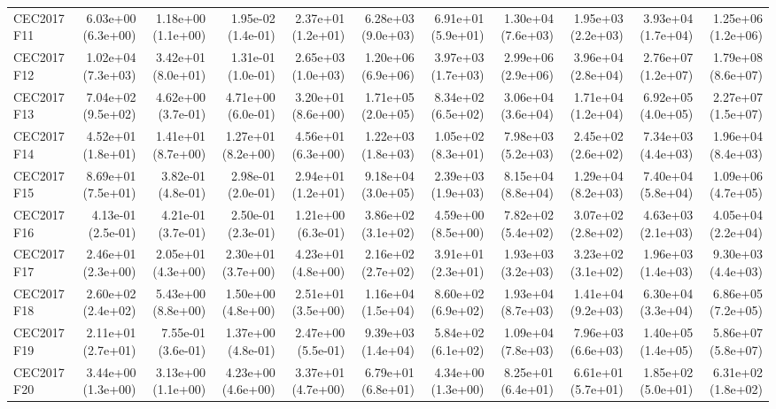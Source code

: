 \begin{longtable}{lrrrrrrrrrr}
CEC2017 F11 & 6.03e+00 (6.3e+00) & 1.18e+00 (1.1e+00) & 1.95e-02 (1.4e-01) & 2.37e+01 (1.2e+01) & 6.28e+03 (9.0e+03) & 6.91e+01 (5.9e+01) & 1.30e+04 (7.6e+03) & 1.95e+03 (2.2e+03) & 3.93e+04 (1.7e+04) & 1.25e+06 (1.2e+06) \\
CEC2017 F12 & 1.02e+04 (7.3e+03) & 3.42e+01 (8.0e+01) & 1.31e-01 (1.0e-01) & 2.65e+03 (1.0e+03) & 1.20e+06 (6.9e+06) & 3.97e+03 (1.7e+03) & 2.99e+06 (2.9e+06) & 3.96e+04 (2.8e+04) & 2.76e+07 (1.2e+07) & 1.79e+08 (8.6e+07) \\
CEC2017 F13 & 7.04e+02 (9.5e+02) & 4.62e+00 (3.7e-01) & 4.71e+00 (6.0e-01) & 3.20e+01 (8.6e+00) & 1.71e+05 (2.0e+05) & 8.34e+02 (6.5e+02) & 3.06e+04 (3.6e+04) & 1.71e+04 (1.2e+04) & 6.92e+05 (4.0e+05) & 2.27e+07 (1.5e+07) \\
CEC2017 F14 & 4.52e+01 (1.8e+01) & 1.41e+01 (8.7e+00) & 1.27e+01 (8.2e+00) & 4.56e+01 (6.3e+00) & 1.22e+03 (1.8e+03) & 1.05e+02 (8.3e+01) & 7.98e+03 (5.2e+03) & 2.45e+02 (2.6e+02) & 7.34e+03 (4.4e+03) & 1.96e+04 (8.4e+03) \\
CEC2017 F15 & 8.69e+01 (7.5e+01) & 3.82e-01 (4.8e-01) & 2.98e-01 (2.0e-01) & 2.94e+01 (1.2e+01) & 9.18e+04 (3.0e+05) & 2.39e+03 (1.9e+03) & 8.15e+04 (8.8e+04) & 1.29e+04 (8.2e+03) & 7.40e+04 (5.8e+04) & 1.09e+06 (4.7e+05) \\
CEC2017 F16 & 4.13e-01 (2.5e-01) & 4.21e-01 (3.7e-01) & 2.50e-01 (2.3e-01) & 1.21e+00 (6.3e-01) & 3.86e+02 (3.1e+02) & 4.59e+00 (8.5e+00) & 7.82e+02 (5.4e+02) & 3.07e+02 (2.8e+02) & 4.63e+03 (2.1e+03) & 4.05e+04 (2.2e+04) \\
CEC2017 F17 & 2.46e+01 (2.3e+00) & 2.05e+01 (4.3e+00) & 2.30e+01 (3.7e+00) & 4.23e+01 (4.8e+00) & 2.16e+02 (2.7e+02) & 3.91e+01 (2.3e+01) & 1.93e+03 (3.2e+03) & 3.23e+02 (3.1e+02) & 1.96e+03 (1.4e+03) & 9.30e+03 (4.4e+03) \\
CEC2017 F18 & 2.60e+02 (2.4e+02) & 5.43e+00 (8.8e+00) & 1.50e+00 (4.8e+00) & 2.51e+01 (3.5e+00) & 1.16e+04 (1.5e+04) & 8.60e+02 (6.9e+02) & 1.93e+04 (8.7e+03) & 1.41e+04 (9.2e+03) & 6.30e+04 (3.3e+04) & 6.86e+05 (7.2e+05) \\
CEC2017 F19 & 2.11e+01 (2.7e+01) & 7.55e-01 (3.6e-01) & 1.37e+00 (4.8e-01) & 2.47e+00 (5.5e-01) & 9.39e+03 (1.4e+04) & 5.84e+02 (6.1e+02) & 1.09e+04 (7.8e+03) & 7.96e+03 (6.6e+03) & 1.40e+05 (1.4e+05) & 5.86e+07 (5.8e+07) \\
CEC2017 F20 & 3.44e+00 (1.3e+00) & 3.13e+00 (1.1e+00) & 4.23e+00 (4.6e+00) & 3.37e+01 (4.7e+00) & 6.79e+01 (6.8e+01) & 4.34e+00 (1.3e+00) & 8.25e+01 (6.4e+01) & 6.61e+01 (5.7e+01) & 1.85e+02 (5.0e+01) & 6.31e+02 (1.8e+02) \\

\end{longtable}
